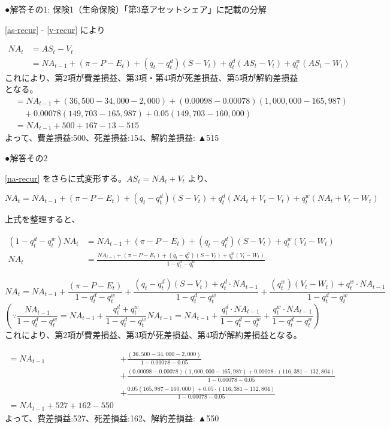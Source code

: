 \documentclass[report,gutter=10mm,fore-edge=10mm,uplatex,dvipdfmx]{jlreq}
\begin{document}
●解答その1: 保険1（生命保険）「第3章アセットシェア」に記載の分解

\eqref{as-recur} - \eqref{v-recur} により

\begin{equation}
\begin{split}
NA_t&=AS_t-V_t \\
&= NA_{t-1}+(\pi-P-E_t)+(q_t-q_t^d)(S-V_t)+q_t^d(AS_t-V_t)+q_t^w(AS_t-W_t)\label{na-recur}
\end{split} 
\end{equation}
 これにより、第2項が費差損益、第3項・第4項が死差損益、第5項が解約差損益
となる。
\begin{equation*}
 \begin{split}
  &= NA_{t-1}+(36,500-34,000-2,000)+(0.00098-0.00078)(1,000,000-165,987)\\
&\quad +0.00078(149,703-165,987)+0.05(149,703-160,000)\\
&=NA_{t-1}+500+167-13-515
 \end{split}
\end{equation*}
よって、費差損益:500、死差損益:154、解約差損益: ▲515

●解答その2

\eqref{na-recur} をさらに式変形する。$AS_t=NA_t+V_t$ より、

$NA_t=NA_{t-1}+(\pi-P-E_t)+(q_t-q^d_t)(S-V_t)+q^d_t(NA_t+V_t-V_t)+q^w_t(NA_t+V_t-W_t)$

上式を整理すると、

\begin{align*}
 (1-q^d_t-q^w_t)NA_t & = NA_{t-1}+(\pi-P-E_t)+(q_t-q^d_t)(S-V_t)+q^w_t(V_t-W_t)\\
NA_t&=\frac{NA_{t-1}+(\pi-P-E_t)+(q_t-q^d_t)(S-V_t)+q^w_t(V_t-W_t)}{1-q^d_t-q^w_t}
\end{align*}

$$
NA_t=NA_{t-1}+\frac{(\pi-P-E_t)}{1-q^d_t-q^w_t}
+\frac{(q_t-q^d_t)(S-V_t)+q^d_t\cdot NA_{t-1}}{1-q^d_t-q^w_t}
+\frac{(q^w_t)(V_t-W_t)+q^w_t\cdot NA_{t-1}}{1-q^d_t-q^w_t}
$$
$$
\left(\because \frac{NA_{t-1}}{1-q^d_t-q^w_t}=NA_{t-1}+\frac{q^d_t+q^w_t}{1-q^d_t-q^w_t}NA_{t-1}
=NA_{t-1}+\frac{q^d_t\cdot NA_{t-1}}{1-q^d_t-q^w_t}+\frac{q^w_t\cdot NA_{t-1}}{1-q^d_t-q^w_t}
\right)
$$
これにより、第2項が費差損益、第3項が死差損益、第4項が解約差損益となる。

\begin{align*}
=NA_{t-1}&+\frac{(36,500-34,000-2,000)}{1-0.00078-0.05}\\
&+\frac{(0.00098-0.00078)(1,000,000-165,987)+0.00078\cdot(116,381-132,804)}{1-0.00078-0.05}\\
&+\frac{0.05(165,987-160,000)+0.05\cdot(116,381-132,804)}{1-0.00078-0.05}\\
= NA_{t-1}+527+162-550
\end{align*}
よって、費差損益:527、死差損益:162、解約差損益: ▲550
\end{document}
